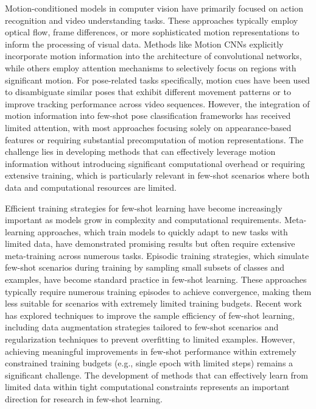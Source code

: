 \documentclass[11pt]{article}
\begin{document}
Motion-conditioned models in computer vision have primarily focused on action recognition and video understanding tasks. These approaches typically employ optical flow, frame differences, or more sophisticated motion representations to inform the processing of visual data. Methods like Motion CNNs explicitly incorporate motion information into the architecture of convolutional networks, while others employ attention mechanisms to selectively focus on regions with significant motion. For pose-related tasks specifically, motion cues have been used to disambiguate similar poses that exhibit different movement patterns or to improve tracking performance across video sequences. However, the integration of motion information into few-shot pose classification frameworks has received limited attention, with most approaches focusing solely on appearance-based features or requiring substantial precomputation of motion representations. The challenge lies in developing methods that can effectively leverage motion information without introducing significant computational overhead or requiring extensive training, which is particularly relevant in few-shot scenarios where both data and computational resources are limited.

Efficient training strategies for few-shot learning have become increasingly important as models grow in complexity and computational requirements. Meta-learning approaches, which train models to quickly adapt to new tasks with limited data, have demonstrated promising results but often require extensive meta-training across numerous tasks. Episodic training strategies, which simulate few-shot scenarios during training by sampling small subsets of classes and examples, have become standard practice in few-shot learning. These approaches typically require numerous training episodes to achieve convergence, making them less suitable for scenarios with extremely limited training budgets. Recent work has explored techniques to improve the sample efficiency of few-shot learning, including data augmentation strategies tailored to few-shot scenarios and regularization techniques to prevent overfitting to limited examples. However, achieving meaningful improvements in few-shot performance within extremely constrained training budgets (e.g., single epoch with limited steps) remains a significant challenge. The development of methods that can effectively learn from limited data within tight computational constraints represents an important direction for research in few-shot learning.
\end{document}
